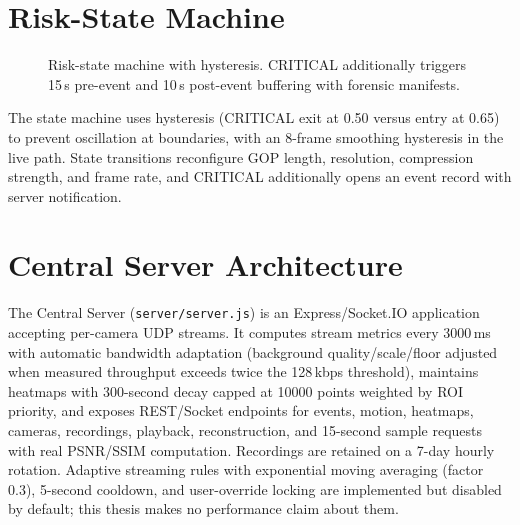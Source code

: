 \section{Risk-State Machine}

\begin{figure}[H]
\centering
{}
\caption{Risk-state machine with hysteresis. CRITICAL additionally triggers 15\,s pre-event and 10\,s post-event buffering with forensic manifests.}
\label{fig:state-machine}
\end{figure}

The state machine uses hysteresis (CRITICAL exit at 0.50 versus entry at 0.65) to prevent oscillation at boundaries, with an 8-frame smoothing hysteresis in the live path. State transitions reconfigure GOP length, resolution, compression strength, and frame rate, and CRITICAL additionally opens an event record with server notification.

\section{Central Server Architecture}

The Central Server (\texttt{server/server.js}) is an Express/Socket.IO application accepting per-camera UDP streams. It computes stream metrics every 3000\,ms with automatic bandwidth adaptation (background quality/scale/floor adjusted when measured throughput exceeds twice the 128\,kbps threshold), maintains heatmaps with 300-second decay capped at 10000 points weighted by ROI priority, and exposes REST/Socket endpoints for events, motion, heatmaps, cameras, recordings, playback, reconstruction, and 15-second sample requests with real PSNR/SSIM computation. Recordings are retained on a 7-day hourly rotation. Adaptive streaming rules with exponential moving averaging (factor 0.3), 5-second cooldown, and user-override locking are implemented but disabled by default; this thesis makes no performance claim about them.

